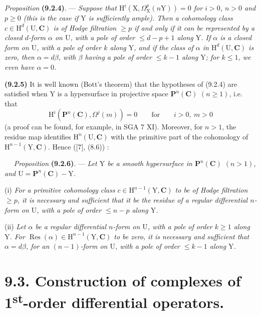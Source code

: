 \documentclass[11pt,leqno]{article}
\newcommand{\Page}[1]{\ifvmode\noindent\else\unskip\ \fi{\footnotesize\textcolor{gray}{[p.\,#1]}}\ \ignorespaces}
\begin{document}
\textit{Proposition} \textbf{(9.2.4)}. — \textit{Suppose that \(\mathrm{H}^{i}(\mathrm{X},\Omega_{\mathrm{X}}^{p}(n\mathrm{Y}))=0\) for \(i>0\), \(n>0\) and \(p\geq0\) (this is the case if \(\mathrm{Y}\) is sufficiently ample). Then a cohomology class \(c\in\mathrm{H}^{d}(\mathrm{U},\mathbf{C})\) is of Hodge filtration \(\geq p\) if and only if it can be represented by a closed \(d\)-form \(\alpha\) on \(\mathrm{U}\), with a pole of order \(\leq d-p+1\) along \(\mathrm{Y}\). If \(\alpha\) is a closed form on \(\mathrm{U}\), with a pole of order \(k\) along \(\mathrm{Y}\), and if the class of \(\alpha\) in \(\mathrm{H}^{d}(\mathrm{U},\mathbf{C})\) is zero, then \(\alpha=d\beta\), with \(\beta\) having a pole of order \(\leq k-1\) along \(\mathrm{Y}\); for \(k\leq1\), we even have \(\alpha=0\).}

\textbf{(9.2.5)} It is well known (Bott’s theorem) that the hypotheses of (9.2.4) are satisfied when \(\mathrm{Y}\) is a hypersurface in projective space \(\mathbf{P}^{n}(\mathbf{C})\) \((n\geq1)\), i.e. that
\[
\mathrm{H}^{i}(\mathbf{P}^{n}(\mathbf{C}),\Omega^{j}(m))=0
\qquad\text{for}\qquad i>0,\ m>0
\]
(a proof can be found, for example, in SGA 7 XI). Moreover, for \(n>1\), the residue map identifies \(\mathrm{H}^{n}(\mathrm{U},\mathbf{C})\) with the primitive part of the cohomology of \(\mathrm{H}^{n-1}(\mathrm{Y},\mathbf{C})\). Hence ([7], (8.6)) :

\Page{50}
\textit{Proposition} \textbf{(9.2.6)}. — \textit{Let \(\mathrm{Y}\) be a smooth hypersurface in \(\mathbf{P}^{n}(\mathbf{C})\) \((n>1)\), and \(\mathrm{U}=\mathbf{P}^{n}(\mathbf{C})-\mathrm{Y}\).}

(i) \textit{For a primitive cohomology class \(c\in\mathrm{H}^{n-1}(\mathrm{Y},\mathbf{C})\) to be of Hodge filtration \(\geq p\), it is necessary and sufficient that it be the residue of a regular differential \(n\)-form on \(\mathrm{U}\), with a pole of order \(\leq n-p\) along \(\mathrm{Y}\).}

(ii) \textit{Let \(\alpha\) be a regular differential \(n\)-form on \(\mathrm{U}\), with a pole of order \(k\geq1\) along \(\mathrm{Y}\). For \(\operatorname{Res}(\alpha)\in\mathrm{H}^{n-1}(\mathrm{Y},\mathbf{C})\) to be zero, it is necessary and sufficient that \(\alpha=d\beta\), for an \((n-1)\)-form on \(\mathrm{U}\), with a pole of order \(\leq k-1\) along \(\mathrm{Y}\).}

\section*{9.3. Construction of complexes of 1\textsuperscript{st}-order differential operators.}
\end{document}
